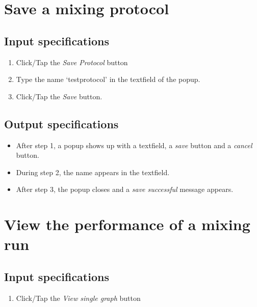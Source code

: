 \section{Save a mixing protocol}

\subsection*{Input specifications}
\begin{enumerate}
\item Click/Tap the \emph{Save Protocol} button
\item Type the name `testprotocol' in the textfield of the popup.
\item Click/Tap the \emph{Save} button.
\end{enumerate}

\subsection*{Output specifications}
\begin{itemize}
\item After step 1, a popup shows up with a textfield, a \emph{save} button and a \emph{cancel} button.
\item During step 2, the name appears in the textfield.
\item After step 3, the popup closes and a \emph{save successful} message appears.
\end{itemize}

\section{View the performance of a mixing run}

\subsection*{Input specifications}
\begin{enumerate}
\item Click/Tap the \emph{View single graph} button
\end{enumerate}

